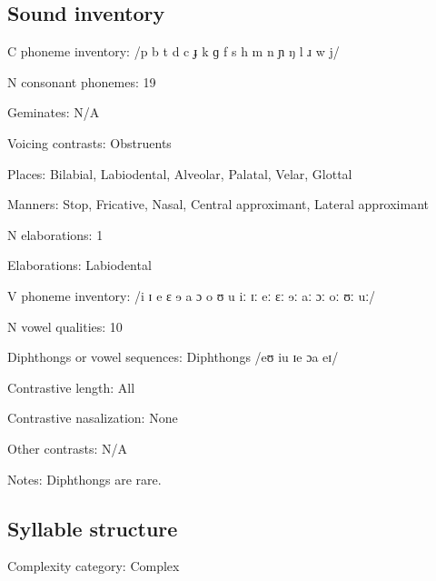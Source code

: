{\subsection*{Sound inventory}
\begin{appendixdesc}

\item[C phoneme inventory:] /p b t d c ɟ k ɡ f s h m n ɲ ŋ l ɹ w j/

\item[N consonant phonemes:] 19

\item[Geminates:] N/A

\item[Voicing contrasts:] Obstruents

\item[Places:] Bilabial, Labiodental, Alveolar, Palatal, Velar, Glottal

\item[Manners:] Stop, Fricative, Nasal, Central approximant, Lateral approximant

\item[N elaborations:] 1

\item[Elaborations:] Labiodental

\item[V phoneme inventory:] /i ɪ e ɛ ɘ a ɔ o ʊ u iː ɪː eː ɛː ɘː aː ɔː oː ʊː uː/

\item[N vowel qualities:] 10

\item[Diphthongs or vowel sequences:] Diphthongs /eʊ iu ɪe ɔa eɪ/

\item[Contrastive length:] All

\item[Contrastive nasalization:] None

\item[Other contrasts:] N/A

\item[Notes:] Diphthongs are rare.
\end{appendixdesc}
\subsection*{Syllable structure}
\begin{appendixdesc}

\item[Complexity category:] Complex


\end{appendixdesc}}
